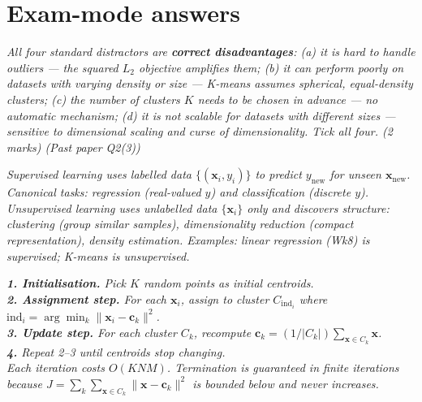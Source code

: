 \documentclass[11pt, a4paper]{article}
\newcommand{\doflag}{\textcolor{defBd}{\textbf{[DO]}}\,}
\begin{document}
\section{Exam-mode answers}

\begin{exambox}
\textit{All four standard distractors are \textbf{correct disadvantages}: (a) it is hard to handle outliers — the squared $L_2$ objective amplifies them; (b) it can perform poorly on datasets with varying density or size — K-means assumes spherical, equal-density clusters; (c) the number of clusters $K$ needs to be chosen in advance — no automatic mechanism; (d) it is not scalable for datasets with different sizes — sensitive to dimensional scaling and curse of dimensionality. Tick all four. (2 marks) (Past paper Q2(3))}
\end{exambox}

\begin{exambox}
\textit{Supervised learning uses labelled data $\{(\mathbf{x}_i, y_i)\}$ to predict $y_{\text{new}}$ for unseen $\mathbf{x}_{\text{new}}$. Canonical tasks: regression (real-valued $y$) and classification (discrete $y$). Unsupervised learning uses unlabelled data $\{\mathbf{x}_i\}$ only and discovers structure: clustering (group similar samples), dimensionality reduction (compact representation), density estimation. Examples: linear regression (Wk8) is supervised; K-means is unsupervised.}
\end{exambox}

\begin{exambox}[{\doflag{}Concept: Write the K-means algorithm.}]
\textit{\textbf{1. Initialisation.} Pick $K$ random points as initial centroids.}\\
\textit{\textbf{2. Assignment step.} For each $\mathbf{x}_i$, assign to cluster $C_{\mathrm{ind}_i}$ where $\mathrm{ind}_i = \arg\min_k \|\mathbf{x}_i - \mathbf{c}_k\|^2$.}\\
\textit{\textbf{3. Update step.} For each cluster $C_k$, recompute $\mathbf{c}_k = (1/|C_k|)\sum_{\mathbf{x}\in C_k}\mathbf{x}$.}\\
\textit{\textbf{4.} Repeat 2--3 until centroids stop changing.}\\[0.2em]
\textit{Each iteration costs $O(KNM)$. Termination is guaranteed in finite iterations because $J = \sum_k\sum_{\mathbf{x}\in C_k}\|\mathbf{x}-\mathbf{c}_k\|^2$ is bounded below and never increases.}
\end{exambox}
\end{document}
